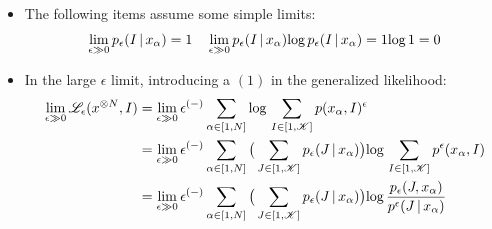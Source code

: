 \begin{frame} [t]
\begin{itemize}
        \item The following items assume 
              some simple limits:
            { \footnotesize
            \begin{align*}
              \lim _{\epsilon \gg 0}
              p _{\epsilon} 
                ( I \,\vert\, x _{\alpha} )
             = 1  
            \quad 
                \lim _{\epsilon \gg 0}
                p _{\epsilon} 
                ( I \,\vert\, x _{\alpha} )
              \textnormal{log}\, p _{\epsilon} 
                ( I \,\vert\, x _{\alpha} )
             = 1 \textnormal{log}\, 1 = 0
            \end{align*}
            }
        \item In the large $\epsilon$ limit,
              introducing a $(1)$ in 
              the generalized likelihood:
            { \footnotesize
            \begin{align*}
              \lim _{\epsilon \gg 0}
                \like {\epsilon} 
                 (x ^{\otimes N}, I) 
            & =
                \lim _{\epsilon \gg 0} 
                \epsilon ^{(-)}
                \sum _{\alpha \in [1, N]}
                \varlog 
                \sum _{I \in [1, \mathscr{K}]}
                p (x _{\alpha} , I)
                  ^{\epsilon}
            \\ & = 
                \lim _{\epsilon \gg 0}
                \epsilon ^{(-)}
                \sum _{\alpha \in [1, N]}
                \big( 
                  \sum _{J \in [1, \mathscr{K}]}
                  p _{\epsilon}
                   \conditional {J} 
                    {x _{\alpha}}
                \big)
                \varlog 
                \sum _{I \in [1, \mathscr{K}]}
                p ^{\epsilon}
                  (x _{\alpha} , I) 
            \\ & = 
                \lim _{\epsilon \gg 0}
                \epsilon ^{(-)}
                \sum _{\alpha \in [1, N]}
                \big( 
                  \sum _{J \in [1, \mathscr{K}]}
                  p _{\epsilon}
                    \conditional {J} 
                     {x _{\alpha}}
                \big)
                \varlog  
                \frac 
                { p _{\epsilon} 
                  (J, x _{\alpha})
                } 
                { p ^{\epsilon} 
                  \conditional 
                   {J} {x _{\alpha}}
                }

\end{align*}}
\end{itemize}
\end{frame}
